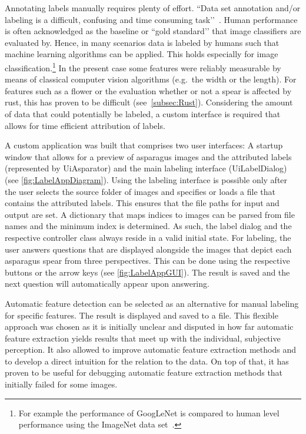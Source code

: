 Annotating labels manually requires plenty of effort. ``Data set annotation and/or labeling is a difficult, confusing and time consuming task’’~\citep[p.~2]{al2018labeling}. Human performance is often acknowledged as the baseline or ``gold standard’’ that image classifiers are evaluated by. Hence, in many scenarios data is labeled by humans such that machine learning algorithms can be applied. This holds especially for image classification.\footnote{For example the performance of GoogLeNet is compared to human level performance using the ImageNet data set~\citep{russakovsky2015imagenet}.} In the present case some features were reliably measurable by means of classical computer vision algorithms (e.g.\ the width or the length). For features such as a flower or the evaluation whether or not a spear is affected by rust, this has proven to be difficult (see~\autoref{subsec:Rust}). Considering the amount of data that could potentially be labeled, a custom interface is required that allows for time efficient attribution of labels.

\bigskip
A custom application was built that comprises two user interfaces: A startup window that allows for a preview of asparagus images and the attributed labels (represented by Ui\textunderscore Asparator) and the main labeling interface (Ui\textunderscore LabelDialog) (see \autoref{fig:LabelAppDiagram}). Using the labeling interface is possible only after the user selects the source folder of images and specifies or loads a file that contains the attributed labels. This ensures that the file paths for input and output are set. A dictionary that maps indices to images can be parsed from file names and the minimum index is determined. As such, the label dialog and the respective controller class always reside in a valid initial state. For labeling, the user answers questions that are displayed alongside the images that depict each asparagus spear from three perspectives. This can be done using the respective buttons or the arrow keys (see \autoref{fig:LabelAppGUI}). The result is saved and the next question will automatically appear upon answering. 

Automatic feature detection can be selected as an alternative for manual labeling for specific features. The result is displayed and saved to a file. This flexible approach was chosen as it is initially unclear and disputed in how far automatic feature extraction yields results that meet up with the individual, subjective perception. It also allowed to improve automatic feature extraction methods and to develop a direct intuition for the relation to the data. On top of that, it has proven to be useful for debugging automatic feature extraction methods that initially failed for some images.

